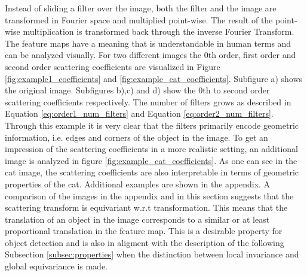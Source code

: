 Instead of sliding a filter over the image, both the filter and the image are transformed in Fourier space and multiplied point-wise. The result of the point-wise multiplication is transformed back through the inverse Fourier Transform. The feature maps have a meaning that is understandable in human terms and can be analyzed visually. For two different images the 0th order, first order and second order scattering coefficients are visualized in Figure \ref{fig:example1_coefficients} and \ref{fig:example_cat_coefficients}. Subfigure a) shows the original image. Subfigures b),c) and d) show the 0th to second order scattering coefficients respectively. The number of filters grows as described in Equation \ref{eq:order1_num_filters} and Equation \ref{eq:order2_num_filters}. Through this example it is very clear that the filters primarily encode geometric information, i.e. edges and corners of the object in the image. To get an  impression of the scattering coefficients in a more realistic setting, an additional image is analyzed in figure \ref{fig:example_cat_coefficients}. As one can see in the cat image, the scattering coefficients are also interpretable in terms of geometric properties of the cat. Additional examples are shown in the appendix. A comparison of the images in the appendix and in this section suggests that the scattering transform is equivariant w.r.t transformation. This means that the translation of an object in the image corresponds to a similar or at least proportional translation in the feature map. This is a desirable property for object detection and is also in aligment with the description of the following Subsection \ref{subsec:properties} when the distinction between local invariance and global equivariance is made. 

\fboxsep=0mm%
\fboxrule=1pt%

